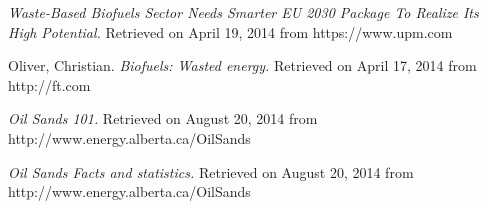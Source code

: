 \documentclass[11pt]{article}
\begin{document}
\begin{thebibliography}{9}
 \emph{Waste-Based Biofuels Sector Needs Smarter EU 2030 Package To Realize Its High Potential.} Retrieved on April 19, 2014 from https://www.upm.com

Oliver, Christian.  \emph{Biofuels: Wasted energy.} Retrieved on April 17, 2014 from http://ft.com

 \emph{Oil Sands 101.} Retrieved on August 20, 2014 from  http://www.energy.alberta.ca/OilSands

 \emph{Oil Sands Facts and statistics.} Retrieved on August 20, 2014 from http://www.energy.alberta.ca/OilSands
 
\end{thebibliography}
\end{document}
